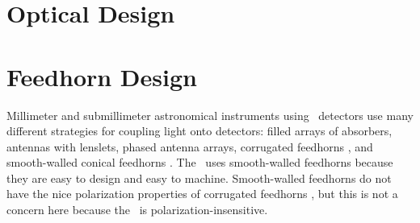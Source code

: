 \section{Optical Design}\label{s:optical-design}


\section{Feedhorn Design}\label{s:feedhorn-design}


Millimeter and submillimeter astronomical instruments using \TES\ detectors use many different strategies for coupling light onto detectors: filled arrays of absorbers\cite{swetz_overview_2011,holland_scuba-2:_2013}, antennas with lenslets\cite{keating_ultra_2011}, phased antenna arrays\cite{obrient_antenna-coupled_2012}, corrugated feedhorns \cite{austermann_sptpol:_2012,niemack_actpol:_2010}, and smooth-walled conical feedhorns \cite{schwan_invited_2011,spt}.
The \Imager\ uses smooth-walled feedhorns because they are easy to design and easy to machine.
Smooth-walled feedhorns do not have the nice polarization properties of corrugated feedhorns \cite{clarricoats_corrugated_1984}, but this is not a concern here because the \Imager\ is polarization-insensitive.

